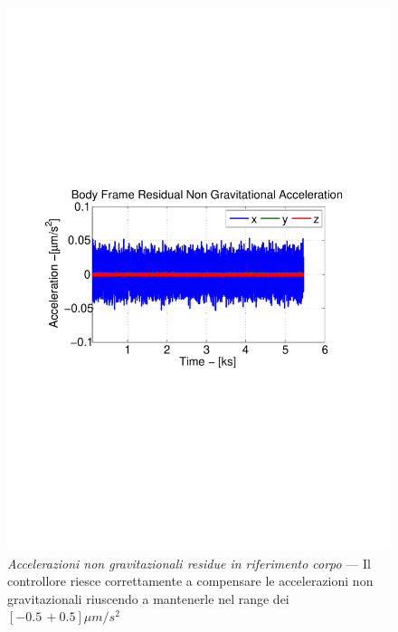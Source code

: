 \begin{figure}
	\includegraphics[width=.6\textwidth,clip=true,trim=2cm 10cm 3cm
	10cm]{control/orbit_control/images/residual_acceleration.pdf}
	\caption{\emph{Accelerazioni non gravitazionali residue in riferimento
	corpo} --- Il controllore riesce correttamente a compensare le accelerazioni
	non gravitazionali riuscendo a mantenerle nel range dei $[-0.5 \, +0.5]%
	\mu m/s^2$}
	\label{fig:drag-acceleration}
\end{figure}
